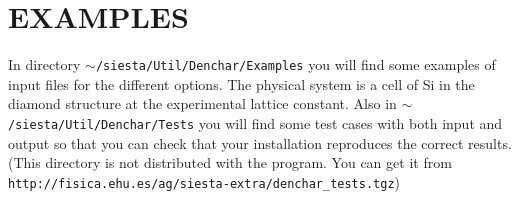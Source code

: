 \section{EXAMPLES}

In directory {\tt $\sim$/siesta/Util/Denchar/Examples} you will find some
examples of input files for the different options. The physical system is a
cell of Si in the diamond structure at the experimental lattice constant.
Also in {\tt $\sim$/siesta/Util/Denchar/Tests} you will find some
test cases with both input and output so that you can 
check that your installation reproduces the correct results.
(This directory is not distributed with the program. You can get it from
{\tt http://fisica.ehu.es/ag/siesta-extra/denchar\_tests.tgz})


